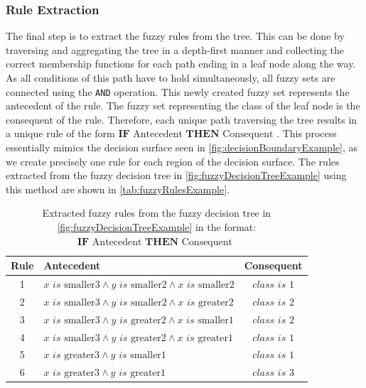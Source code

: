 \subsubsection{Rule Extraction}

The final step is to extract the fuzzy rules from the tree. This can be done by traversing and aggregating the tree in a depth-first manner and collecting the correct membership functions for each path ending in a leaf node along the way. As all conditions of this path have to hold simultaneously, all fuzzy sets are connected using the \texttt{AND} operation. This newly created fuzzy set represents the antecedent of the rule. The fuzzy set representing the class of the leaf node is the consequent of the rule. Therefore, each unique path traversing the tree results in a unique rule of the form $\textbf{IF} \text{ Antecedent } \textbf{THEN} \text{ Consequent }$. This process essentially mimics the decision surface seen in \autoref{fig:decisionBoundaryExample}, as we create precisely one rule for each region of the decision surface. The rules extracted from the fuzzy decision tree in \autoref{fig:fuzzyDecisionTreeExample} using this method are shown in \autoref{tab:fuzzyRulesExample}.


\newcommand{\is}{\textit{ is }}


\begin{table}[H]
    \centering
    \begin{tabular}{c|l|c}
        \textbf{Rule} & \textbf{Antecedent}                                                             & \textbf{Consequent} \\
        \hline
        1             & $x \is \text{smaller3} \land y \is \text{smaller2} \land x \is \text{smaller2}$ & $class \is 1$       \\
        2             & $x \is \text{smaller3} \land y \is \text{smaller2} \land x \is \text{greater2}$ & $class \is 2$       \\
        3             & $x \is \text{smaller3} \land y \is \text{greater2} \land x \is \text{smaller1}$ & $class \is 2$       \\
        4             & $x \is \text{smaller3} \land y \is \text{greater2} \land x \is \text{greater1}$ & $class \is 1$       \\
        5             & $x \is \text{greater3} \land y \is \text{smaller1}$                             & $class \is 1$       \\
        6             & $x \is \text{greater3} \land y \is \text{greater1}$                             & $class \is 3$       \\
    \end{tabular}
    \caption[Extracted fuzzy rules from the example fuzzy decision tree]{Extracted fuzzy rules from the fuzzy decision tree in \autoref{fig:fuzzyDecisionTreeExample} in the format: $\textbf{IF} \text{ Antecedent } \textbf{THEN} \text{ Consequent }$}
    \label{tab:fuzzyRulesExample}
\end{table}

